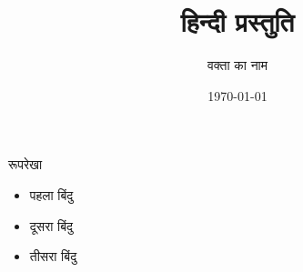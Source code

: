 \documentclass{beamer}
\title{हिन्दी प्रस्तुति}
\author{वक्ता का नाम}
\date{\today}
\begin{document}
\begin{frame}
  \titlepage
\end{frame}

\begin{frame}{रूपरेखा}
  \begin{itemize}
    \item पहला बिंदु
    \item दूसरा बिंदु
    \item तीसरा बिंदु
  \end{itemize}
\end{frame}
\end{document}
